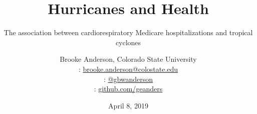 \usepackage{booktabs}
\usepackage{array}
\usepackage{colortbl}
\usepackage[british]{babel}
\usepackage{graphicx,hyperref,url}
\usepackage{fontawesome}
\usepackage{hyperref}
\usepackage{adjustbox}
\hypersetup{colorlinks=true,allcolors=blue}

\title{Hurricanes and Health}
\subtitle{The association between cardiorespiratory Medicare hospitalizations and tropical cyclones}
\date{April 8, 2019}

\author[Anderson]{
  Brooke Anderson, Colorado State University \\
  {\small \faEnvelope: \url{brooke.anderson@colostate.edu}} \\
  {\small \faTwitter: \href{www.twitter.com/gbwanderson}{@gbwanderson}} \\
  {\small \faGithub:  \url{github.com/geanders}}
  }


